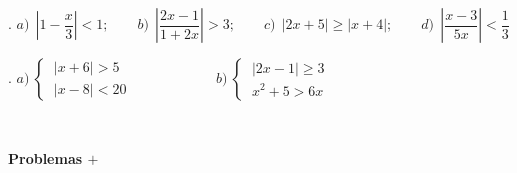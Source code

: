 \begin{mipropuesto}
. $a)\ \ \left| 1-\dfrac x 3 \right| < 1 ;\qquad  b)\ \ \left| \dfrac{2x-1}{1+2x} \right| > 3; \qquad c)\ \ |2x+5|\geqslant |x+4|;\qquad d)\ \ \left| \dfrac{x-3}{5x} \right| < \dfrac 1 3  $
\end{mipropuesto}
\vspace{-8mm}
\begin{flushright}
	\begin{footnotesize} \textcolor{gris}{\rotatebox{180}{ $a)\ ]0,6[;\qquad b)\ ]-1,-1/2[\, \cup ]-1/2,-1/4[ ; \qquad c)\ ]-\infty,-3]\, \cup \, [-1,+\infty[;\qquad d)\ ]-\infty, -9/2[\, \cup \, ]9/8,+\infty[ $ }}	\end{footnotesize}
\end{flushright}

\begin{mipropuesto}
. $a)\ \begin{cases} 
 \ |x+6|>5 \\ \ |x-8|<20	
 \end{cases} \qquad \qquad \qquad b)\ \begin{cases}
 \ |2x-1|\geqslant 3 \\ \ x^2+5>6x	
 \end{cases}$

\end{mipropuesto}
\vspace{-8mm}
\begin{flushright}
	\begin{footnotesize} \textcolor{gris}{\rotatebox{180}{ $a)\ \ ]-12,-11[ \, \cup \, ]-1,28[;\qquad b)\ \ ]-\infty,-1] \, \cup \, ]5,+\infty[$ }}	\end{footnotesize}
\end{flushright}


	



\newpage

$\qquad$


\begin{adjustwidth}{50pt}{250pt}
\begin{cuadro-naranja}
\textbf{\huge{Problemas $\boldsymbol{+}$}}\normalsize{$\, $}
\end{cuadro-naranja}	
\end{adjustwidth}



